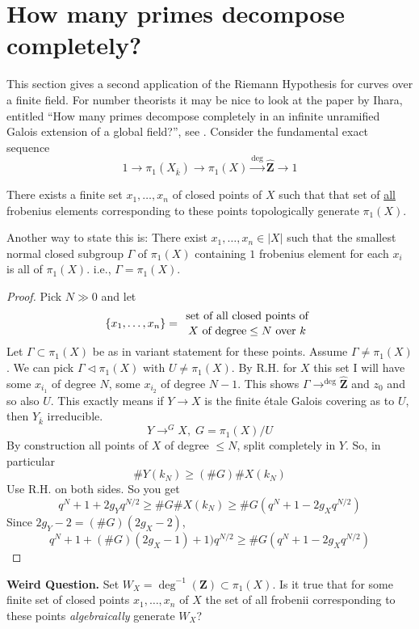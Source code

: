 \section{How many primes decompose completely?}
\label{section-how-many}

\noindent
This section gives a second application of the Riemann Hypothesis for
curves over a finite field. For number theorists it may be nice
to look at the paper by Ihara, entitled
``How many primes decompose completely in an infinite unramified Galois
extension of a global field?'', see \cite{Ihara}.
Consider the fundamental exact sequence
$$
1 \to
\pi_1(X_{\overline k}) \to
\pi_1(X) \xrightarrow{\deg}
\widehat{\mathbf{Z}} \to 1
$$

\begin{proposition}
\label{proposition-finite-set-frobenii-generate-topologically}
There exists a finite set $x_1, \ldots, x_n$ of closed points of $X$
such that that set of \underline{all} frobenius elements corresponding to these
points topologically generate $\pi_1(X)$.
\end{proposition}

\noindent
Another way to state this is:
There exist $x_1, \ldots, x_n\in |X|$ such that
the smallest normal closed subgroup $\Gamma$ of $\pi_1(X)$
containing $1$ frobenius element for each $x_i$ is all of $\pi_1(X)$. i.e.,
$\Gamma = \pi_1(X)$.

\begin{proof}
Pick $N\gg 0$ and let
$$
\left\{x_1, \ldots, x_n\right\}={\text{ set of all closed points of
}\atop X\text{ of degree} \leq N\text{ over } k}
$$
Let $\Gamma\subset \pi_1(X)$ be as in variant statement for these
points. Assume $\Gamma\neq \pi_1(X)$. We can pick $\Gamma\lhd \pi_1(X)$ with
$U\neq \pi_1(X)$. By R.H. for $X$ this set I will have some $x_{i_1}$ of degree
$N$, some $x_{i_2}$ of degree $N-1$. This shows
$\Gamma\to^{\deg}\widehat{\mathbf{Z}}$ and $z_0$ and so also $U$. This exactly
means if $Y\to X$ is the finite \'etale Galois covering as to $U$, then
$Y_{\overline k}$ irreducible.
$$
Y\to^G X, \; G = \pi_1(X)/U
$$
By construction all points of $X$ of degree $\leq N$, split
completely in $Y$. So, in particular
$$
\# Y(k_N)\geq (\# G)\# X(k_N)
$$
Use R.H. on both sides. So you get
$$
q^N+1+2g_Yq^{N/2}\geq \# G\# X(k_N)\geq \#
G(q^N+1-2g_Xq^{N/2})
$$
Since $2g_Y-2 = (\# G)(2g_X-2)$,
$$
q^N+1+(\# G)(2g_X-1)+1)q^{N/2}\geq \#
G(q^N+1-2g_Xq^{N/2})
$$
\end{proof}	

\noindent
{\bf Weird Question.}
Set $W_X = \deg^{-1}(\mathbf{Z})\subset \pi_1(X)$.
Is it true that for some finite set of closed points $x_1, \ldots, x_n$ of $X$
the set of all frobenii corresponding to these points
{\it algebraically} generate $W_X$?

